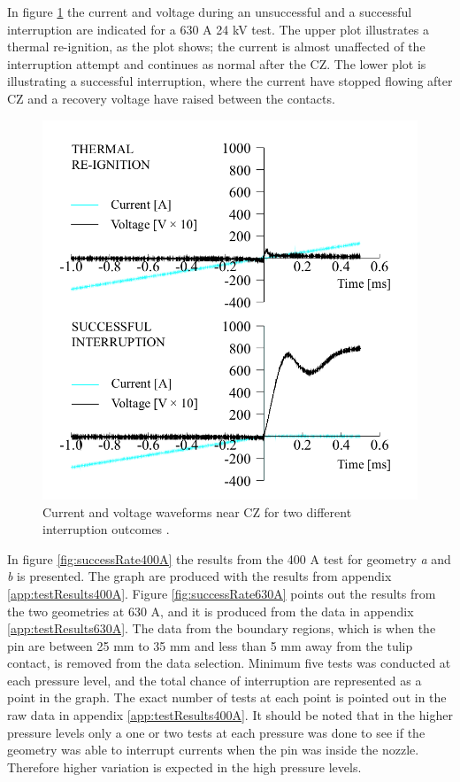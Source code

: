 \documentclass[10pt,a4paper,twoside]{article}
\begin{document}
In figure \ref{fig:CurrentAndVoltageWaveform} the current and voltage during an unsuccessful and a successful interruption are indicated for a 630 A 24 kV test. The upper plot illustrates a thermal re-ignition, as the plot shows; the current is almost unaffected of the interruption attempt and continues as normal after the CZ. The lower plot is illustrating a successful interruption, where the current have stopped flowing after CZ and a recovery voltage have raised between the contacts.

\begin{figure}[H]
\centering
\includegraphics[scale=0.3]{Bilder/Results/differentInterruptions.png}
\caption{Current and voltage waveforms near CZ for two different interruption outcomes \cite{bib:AFIMVLBA}.} \label{fig:CurrentAndVoltageWaveform}
\end{figure}

In figure \ref{fig:successRate400A} the results from the 400 A test for geometry \textit{a} and \textit{b} is presented. The graph are produced with the results from appendix \ref{app:testResults400A}. Figure \ref{fig:successRate630A} points out the results from the two geometries at 630 A, and it is produced from the data in appendix \ref{app:testResults630A}. The data from the boundary regions, which is when the pin are between 25 mm to 35 mm and less than 5 mm away from the tulip contact, is removed from the data selection. Minimum five tests was conducted at each pressure level, and the total chance of interruption are represented as a point in the graph. The exact number of tests at each point is pointed out in the raw data in appendix \ref{app:testResults400A}. It should be noted that in the higher pressure levels only a one or two tests at each pressure was done to see if the geometry was able to interrupt currents when the pin was inside the nozzle. Therefore higher variation is expected in the high pressure levels.  
\end{document}
